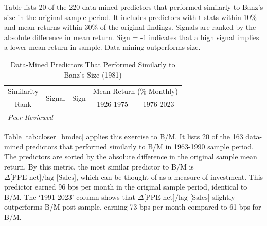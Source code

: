 \begin{table}[p]
  \caption{Data-Mined Predictors That Performed Similarly to Banz's Size (1981)}
    \label{tab:closer_size}
    
    \begin{singlespace}
    \noindent Table lists 20 of the 220 data-mined predictors that performed similarly to Banz's \citeyearpar{banz1981relationship} size in the original sample period. It includes predictors with t-stats within 10\% and mean returns within 30\% of the original findings. Signals are ranked by the absolute difference in mean return. Sign = -1 indicates that a high signal implies a lower mean return in-sample. Data mining outperforms  size.
    \end{singlespace}
    \begin{centering}
    \vspace{-1ex}
    \par\end{centering}
    \centering{}\setlength{\tabcolsep}{1.0ex} \footnotesize
    \begin{center}
    \begin{tabular}{rlrrr} \toprule 
    \multicolumn{1}{c}{Similarity} 
        & \multirow{2}[2]{*}{Signal} 
        & \multicolumn{1}{l}{\multirow{2}[2]{*}{Sign}} & \multicolumn{2}{c}{Mean Return (\% Monthly)} \\   
    \multicolumn{1}{c}{Rank} 
        &  &  & \multicolumn{1}{c}{1926-1975} & \multicolumn{1}{c}{1976-2023} \\ \midrule \multicolumn{5}{l}{\textit{Peer-Reviewed}} \\ \midrule   
    
    \bottomrule \end{tabular}%
    \end{center} 
\end{table}


Table \ref{tab:closer_bmdec} applies this exercise to  B/M. It lists 20 of the 163 data-mined predictors that performed similarly to B/M in  1963-1990 sample period. The predictors are sorted by the absolute difference in the original sample mean return. By this metric, the most similar predictor to B/M is $\Delta \text{[PPE net]} / \text{lag [Sales]}$, which can be thought of as a measure of investment. This predictor earned 96 bps per month in the original sample period, identical to B/M. The `1991-2023' column shows that $\Delta \text{[PPE net]} / \text{lag [Sales]}$ slightly outperforms B/M post-sample, earning 73 bps per month compared to 61 bps for B/M. 

